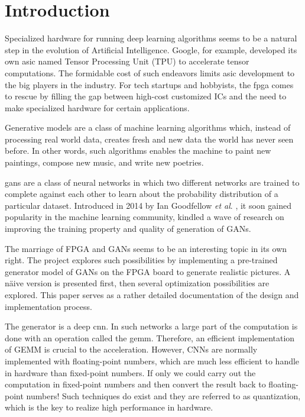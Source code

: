 
\chapter{Introduction}

Specialized hardware for running deep learning algorithms seems to be a natural step in the evolution of
Artificial Intelligence.  Google, for example, developed its own \gls{asic} named Tensor Processing Unit (TPU)
to accelerate tensor computations. The formidable cost of such endeavors limits \gls{asic} development to
the big players in the industry. For tech startups and hobbyists, the \gls{fpga} comes to
rescue by filling the gap between high-cost customized ICs and the need to make specialized hardware for certain
applications.

Generative models are a class of machine learning algorithms which, instead of processing real world data,
creates fresh and new data the world has never seen before. In other words, such algorithms enables
the machine to paint new paintings, compose new music, and write new poetries.

\gls{gans} are a class of neural networks in which two different networks are
trained to complete against each other to learn about the probability distribution of a particular dataset.
Introduced in 2014 by Ian Goodfellow \textit{et al}. \cite{goodfellow:gan}, it soon gained popularity in the machine learning
community, kindled a wave of research on improving the training property and quality of generation of GANs.

The marriage of FPGA and GANs seems to be an interesting topic in its own right. The project explores such
possibilities by implementing a pre-trained generator model of GANs on the FPGA board to generate realistic
pictures. A näive version is presented first, then several optimization possibilities are explored. This
paper serves as a rather detailed documentation of the design and implementation process.

The generator is a deep \gls{cnn}. In such networks a large part of the computation is
done with an operation called the \gls{gemm}. Therefore, an efficient implementation
of GEMM is crucial to the acceleration. However, CNNs are normally implemented with floating-point numbers,
which are much less efficient to handle in hardware than fixed-point numbers. If only we could carry out
the computation in fixed-point numbers and then convert the result back to floating-point numbers! Such
techniques do exist and they are referred to as quantization, which is the key to realize high performance
in hardware.

\clearpage %
